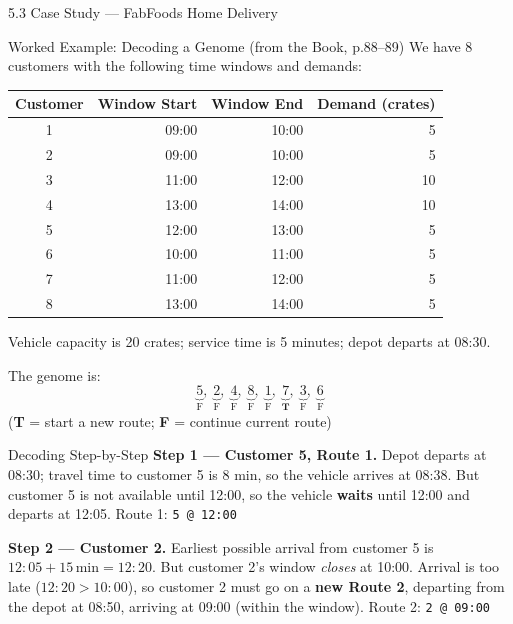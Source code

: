 \documentclass[aspectratio=169,10pt]{beamer}
\begin{document}
\begin{frame}[allowframebreaks]{5.3 Case Study — FabFoods Home Delivery}
  \begin{exampleblock}{Worked Example: Decoding a Genome (from the Book, p.88--89)}
    We have 8 customers with the following time windows and demands:

    \begin{center}
    \small
    \begin{tabular}{crrr}
      \toprule
      Customer & Window Start & Window End & Demand (crates) \\
      \midrule
      1 & 09:00 & 10:00 & 5 \\
      2 & 09:00 & 10:00 & 5 \\
      3 & 11:00 & 12:00 & 10 \\
      4 & 13:00 & 14:00 & 10 \\
      5 & 12:00 & 13:00 & 5 \\
      6 & 10:00 & 11:00 & 5 \\
      7 & 11:00 & 12:00 & 5 \\
      8 & 13:00 & 14:00 & 5 \\
      \bottomrule
    \end{tabular}
    \end{center}

    Vehicle capacity is 20 crates; service time is 5 minutes; depot departs
    at 08:30.

    \medskip
    The genome is:
    \[
      \underbrace{5}_{\text{F}},\;
      \underbrace{2}_{\text{F}},\;
      \underbrace{4}_{\text{F}},\;
      \underbrace{8}_{\text{F}},\;
      \underbrace{1}_{\text{F}},\;
      \underbrace{7}_{\textbf{T}},\;
      \underbrace{3}_{\text{F}},\;
      \underbrace{6}_{\text{F}}
    \]
    (\textbf{T} = start a new route; \textbf{F} = continue current route)
  \end{exampleblock}

\framebreak

  \begin{exampleblock}{Decoding Step-by-Step}
    \textbf{Step 1 — Customer 5, Route 1.}
    Depot departs at 08:30; travel time to customer 5 is 8 min, so the vehicle
    arrives at 08:38.  But customer 5 is not available until 12:00, so the
    vehicle \textbf{waits} until 12:00 and departs at 12:05.
    Route 1: \texttt{5 @ 12:00}

    \medskip
    \textbf{Step 2 — Customer 2.}
    Earliest possible arrival from customer 5 is $12:05 + 15\,\text{min} = 12:20$.
    But customer 2's window \emph{closes} at 10:00.  Arrival is too late
    ($12:20 > 10:00$), so customer 2 must go on a \textbf{new Route 2},
    departing from the depot at 08:50, arriving at 09:00 (within the window).
    Route 2: \texttt{2 @ 09:00}


\end{exampleblock}
\end{frame}
\end{document}
